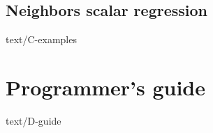 \documentclass[epsbased,copyleft,final,loe, lof,extendedindex,firstnumbered,tfg,covers,english]{tfgtfmthesisuam}
\begin{document}
	\section{Neighbors scalar regression\label{EX:SCALARREG}}{text/C-examples}

\chapter{Programmer’s guide\label{CAP:GUIDE}}{text/D-guide}
\end{document}
